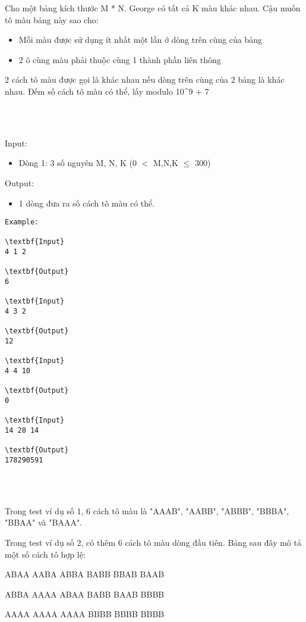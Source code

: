 

Cho một bảng kích thước M * N. George có tất cả K màu khác nhau. Cậu muốn tô màu bảng này sao cho:
\begin{itemize}
	\item 

Mỗi màu được sử dụng ít nhất một lần ở dòng trên cùng của bảng
	\item 

2 ô cùng màu phải thuộc cùng 1 thành phần liên thông
\end{itemize}

2 cách tô màu được gọi là khác nhau nếu dòng trên cùng của 2 bảng là khác nhau. Đếm số cách tô màu có thể, lấy modulo 10^9 + 7


\\ 

Input:
\begin{itemize}
	\item 

Dòng 1: 3 số nguyên M, N, K (0 $<$ M,N,K  $\le$  300)
\end{itemize}

Output:
\begin{itemize}
	\item 

1 dòng đưa ra số cách tô màu có thể.
\end{itemize}
\begin{verbatim}
Example:

\textbf{Input}
4 1 2

\textbf{Output}
6

\textbf{Input}
4 3 2

\textbf{Output}
12

\textbf{Input}
4 4 10

\textbf{Output}
0

\textbf{Input}
14 28 14

\textbf{Output}
178290591\end{verbatim}


\\ 

Trong test ví dụ số 1, 6 cách tô màu là "AAAB", "AABB", "ABBB", "BBBA", "BBAA" và "BAAA".

Trong test ví dụ số 2, có thêm 6 cách tô màu dòng đầu tiên. Bảng sau đây mô tả một số cách tô hợp lệ:

ABAA AABA ABBA BABB BBAB BAAB

ABBA AAAA ABAA BABB BAAB BBBB

AAAA AAAA AAAA BBBB BBBB BBBB


\\ 
